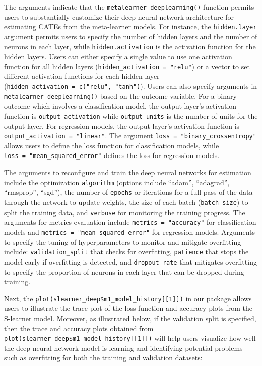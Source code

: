 The arguments indicate that the \texttt{metalearner\_deeplearning()} function
permits users to substantially customize their deep neural network
architecture for estimating CATEs from the meta-learner models. For
instance, the \texttt{hidden.layer} argument permits users to specify the
number of hidden layers and the number of neurons in each layer, while
\texttt{hidden.activation} is the activation function for the hidden layers.
Users can either specify a single value to use one activation function
for all hidden layers (\texttt{hidden\_activation\ =\ "relu"}) or a vector to set
different activation functions for each hidden layer
(\texttt{hidden\_activation\ =\ c("relu",\ "tanh")}). Users can also specify
arguments in \texttt{metalearner\_deeplearning()} based on the outcome variable.
For a binary outcome which involves a classification model, the output
layer's activation function is \texttt{output\_activation} while \texttt{output\_units}
is the number of units for the output layer. For regression models, the
output layer's activation function is \texttt{output\_activation\ =\ "linear"}.
The argument \texttt{loss\ =\ "binary\_crossentropy"} allows users to define the
loss function for classification models, while
\texttt{loss\ =\ "mean\_squared\_error"} defines the loss for regression models.

The arguments to reconfigure and train the deep neural networks for
estimation include the optimization \texttt{algorithm} (options include ``adam'',
``adagrad'', ``rmsprop'', ``sgd''), the number of \texttt{epochs} or iterations for a
full pass of the data through the network to update weights, the size of
each batch (\texttt{batch\_size}) to split the training data, and \texttt{verbose} for
monitoring the training progress. The arguments for metrics evaluation
include \texttt{metrics\ =\ "accuracy"} for classification models and
\texttt{metrics\ =\ "mean\ squared\ error"} for regression models. Arguments to
specify the tuning of hyperparameters to monitor and mitigate
overfitting include: \texttt{validation\_split} that checks for overfitting,
\texttt{patience} that stops the model early if overfitting is detected, and \texttt{dropout\_rate}
that mitigates overfitting to specify the proportion of neurons in each
layer that can be dropped during training.

Next, the \texttt{plot(slearner\_deep\$m1\_model\_history{[}{[}1{]}{]})} in our
 package allows users to illustrate the trace
plot of the loss function and accuracy plots from the S-learner model.
Moreover, as illustrated below, if the validation split is specified,
then the trace and accuracy plots obtained from
\texttt{plot(slearner\_deep\$m1\_model\_history{[}{[}1{]}{]})} will help users visualize
how well the deep neural network model is learning and identifying
potential problems such as overfitting for both the training and
validation datasets:


